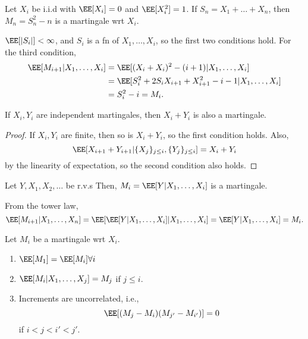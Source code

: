 \begin{example}
\exlabel

Let $X_i$ be i.i.d with $\EE[X_i]=0$ and $\EE[X_i^2] = 1$. If $S_n = X_1 + \hdots + X_n$, then $M_n = S_n^2 - n$ is a martingale wrt $X_i$. 
\end{example}

$\EE[\vert S_i\vert] < \infty$, and $S_i$ is a fn of $X_1, \hdots, X_i$, so the first two conditions hold. For the third condition, 
\begin{align*}
	\EE[M_{i+1}|X_1,\hdots, X_i] &= \EE[(X_i+X_i)^2 - (i+1) | X_1, \hdots, X_i]\\
															 &= \EE[S_i^2 + 2S_iX_{i+1}+X_{i+1}^2 - i - 1 | X_1, \hdots, X_i] \\
															 &= S_i^2 - i = M_i. 
\end{align*}

\begin{theorem}
\lemlabel

If $X_i, Y_i$ are independent martingales, then $X_i+Y_i$ is also a martingale.
\end{theorem}

\begin{proof}
If $X_i,Y_i$ are finite, then so is $X_i+Y_i$, so the first condition holds. Also, 
\[\EE[X_{i+1}+Y_{i+1}|\{X_j\}_{j\leq i}, \{Y_j\}_{j\leq i}] = X_i+Y_i\] 
by the linearity of expectation, so the second condition also holds. 
\end{proof}

\begin{example}

Let $Y, X_1, X_2, \hdots$ be r.v.s Then, $M_i = \EE[Y|X_1, \hdots, X_i]$ is a martingale. 
\end{example}

From the tower law, 
\[\EE[M_{i+1}|X_1, \hdots, X_n] = \EE[\EE[Y|X_1, \hdots, X_i]|X_1, \hdots, X_i] = \EE[Y|X_1, \hdots, X_i] = M_i.\] 

\begin{theorem}
\proplabel

Let $M_i$ be a martingale wrt $X_i$. 

\begin{enumerate}
	\item $\EE[M_1] = \EE[M_i]\forall i$
	\item $\EE[M_i|X_1,\hdots,X_j] = M_j$ if $j\leq i$. 
	\item Increments are uncorrelated, i.e., 
		\[\EE[(M_j-M_i)(M_{j'} - M_{i'})] = 0\]
		if $i < j < i' < j'$. 
\end{enumerate}
\end{theorem}

